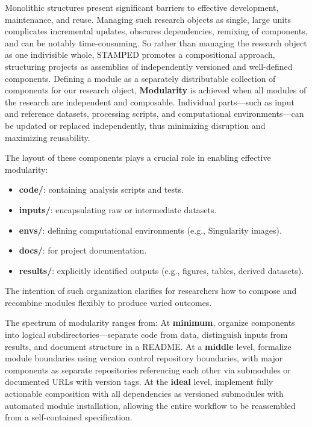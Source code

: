 \documentclass{article}
\begin{document}
Monolithic structures present significant barriers to effective development, maintenance, and reuse.
Managing such research objects as single, large units complicates incremental updates, obscures dependencies, remixing of components, and can be notably time-consuming.
So rather than managing the research object as one indivisible whole, STAMPED promotes a compositional approach, structuring projects as assemblies of independently versioned and well-defined components.
Defining a module as a separately distributable collection of components for our research object, \textbf{Modularity} is achieved when all modules of the research are independent and composable.
Individual parts—such as input and reference datasets, processing scripts, and computational environments—can be updated or replaced independently, thus minimizing disruption and maximizing reusability.

The layout of these components plays a crucial role in enabling effective modularity:

\begin{itemize}
  \item \textbf{code/}: containing analysis scripts and tests.
  \item \textbf{inputs/}: encapsulating raw or intermediate datasets.
  \item \textbf{envs/}: defining computational environments (e.g., Singularity images).
  \item \textbf{docs/}: for project documentation.
  \item \textbf{results/}: explicitly identified outputs (e.g., figures, tables, derived datasets).
\end{itemize}

The intention of such organization clarifies for researchers how to compose and recombine modules flexibly to produce varied outcomes.

The spectrum of modularity ranges from:
At \textbf{minimum}, organize components into logical subdirectories---separate code from data, distinguish inputs from results, and document structure in a README.
At a \textbf{middle} level, formalize module boundaries using version control repository boundaries, with major components as separate repositories referencing each other via submodules or documented URLs with version tags.
At the \textbf{ideal} level, implement fully actionable composition with all dependencies as versioned submodules with automated module installation, allowing the entire workflow to be reassembled from a self-contained specification.
\end{document}
